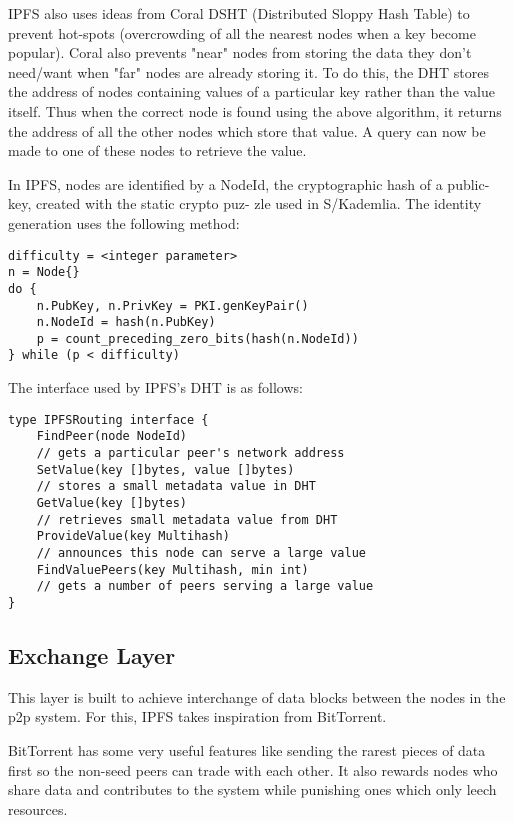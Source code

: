 IPFS also uses ideas from Coral DSHT (Distributed Sloppy Hash Table) to prevent hot-spots (overcrowding of all the nearest nodes when a key become popular). Coral also prevents "near" nodes from storing the data they don't need/want when "far" nodes are already storing it. To do this, the DHT stores the address of nodes containing values of a particular key rather than the value itself. Thus when the correct node is found using the above algorithm, it returns the address of all the other nodes which store that value. A query can now be made to one of these nodes to retrieve the value.


In IPFS, nodes are identified by a NodeId, the cryptographic hash
of a public-key, created with the static crypto puz-
zle used in S/Kademlia. The identity generation uses the following method:

\begin{verbatim}
difficulty = <integer parameter>
n = Node{}
do {
    n.PubKey, n.PrivKey = PKI.genKeyPair()
    n.NodeId = hash(n.PubKey)
    p = count_preceding_zero_bits(hash(n.NodeId))
} while (p < difficulty)
\end{verbatim}

The interface used by IPFS's DHT is as follows:

\begin{verbatim}
type IPFSRouting interface {
    FindPeer(node NodeId)
    // gets a particular peer's network address
    SetValue(key []bytes, value []bytes)
    // stores a small metadata value in DHT
    GetValue(key []bytes)
    // retrieves small metadata value from DHT
    ProvideValue(key Multihash)
    // announces this node can serve a large value
    FindValuePeers(key Multihash, min int)
    // gets a number of peers serving a large value
}
\end{verbatim}



\subsection{Exchange Layer}

This layer is built to achieve interchange of data blocks between the nodes in the p2p system. For this, IPFS takes inspiration from BitTorrent\cite{Pouwelse:2005:BPF:2138958.2138984}.

BitTorrent has some very useful features like sending the rarest pieces of data first so the non-seed peers can trade with each other. It also rewards nodes who share data and contributes to the system while punishing ones which only leech resources.



